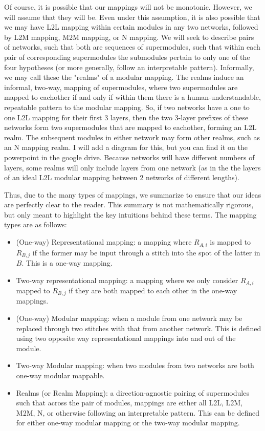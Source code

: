 \documentclass{article} %
\begin{document}
Of course, it is possible that our mappings will not be monotonic. However, we will assume that they will be. Even under this assumption, it is also possible that we may have L2L 
mapping within certain modules in any two networks, followed by L2M mapping, M2M mapping, or N mapping. We will seek to describe pairs of networks, such that both are sequences of supermodules,
such that within each pair of corresponding supermodules the submodules pertain to only one of the four hypotheses (or more generally, follow an interpretable pattern).
Informally, we may call these the "realms" of a modular mapping. The realms induce an informal, two-way, mapping of supermodules, where two supermodules are mapped to eachother if and only if
within them there is a human-understandable, repeatable pattern to the modular mapping. So, if two networks have a one to one L2L mapping for their first 3 layers, then the two 3-layer prefixes of
these networks form two supermodules that are mapped to eachother, forming an L2L realm. The subsequent modules in either network may form other realms, such as an N mapping realm. I will add a
diagram for this, but you can find it on the powerpoint in the google drive. Because networks will have different numbers of layers, some realms will only include layers from one network (as in the
the layers of an ideal L2L modular mapping between 2 networks of different lengths).

Thus, due to the many types of mappings, we summarize to ensure that our ideas are perfectly clear to the reader. This summary is not mathematically rigorous, but
only meant to highlight the key intuitions behind these terms. The mapping types are as follows:
\begin{itemize}
   \item (One-way) Representational mapping: a mapping where \(R_{A,i}\) is mapped to \(R_{B,j}\) if the former may be input through a stitch into the spot of the latter in \(B\). This is a one-way mapping.
   \item Two-way representational mapping: a mapping where we only consider \(R_{A,i}\) mapped to \(R_{B,j}\) if they are both mapped to each other in the one-way mappings.
   \item (One-way) Modular mapping: when a module from one network may be replaced through two stitches with that from another network. This is defined using two opposite way representational mappings into and out of the module.
   \item Two-way Modular mapping: when two modules from two networks are both one-way modular mappable.
   \item Realms (or Realm Mapping): a direction-agnostic pairing of supermodules such that across the pair of modules, mappings are either all L2L, L2M, M2M, N, or otherwise following an interpretable pattern. This can be defined for either one-way modular mapping or the two-way modular mapping.
\end{itemize}
\end{document}
